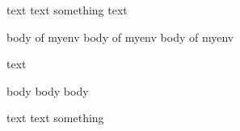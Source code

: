 text text
\if something \fi text
\begin{myenv}
	body of myenv
	body of myenv
	body of myenv
\end{myenv}

text

\begin{anotherenv}
	body
	body
	body
\end{anotherenv}

text text
\if something \fi